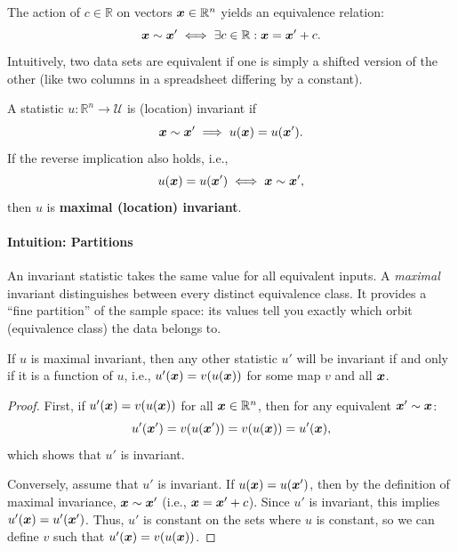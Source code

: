The action of \(c \in \mathbb{R}\) on vectors \(\boldsymbol{x} \in \mathbb{R}^n\) yields an equivalence relation:
\[\boldsymbol{x} \sim \boldsymbol{x}' \iff \exists c \in \mathbb{R} : \boldsymbol{x} = \boldsymbol{x}' + c.\]
Intuitively, two data sets are equivalent if one is simply a shifted version of the other (like two columns in a spreadsheet differing by a constant).

\begin{definition}

A statistic \(u: \mathbb{R}^n \to \mathcal{U}\) is (location) invariant if
\begin{equation*} \label{eq:invariant_def}
\boldsymbol{x} \sim \boldsymbol{x}' \implies u(\boldsymbol{x}) = u(\boldsymbol{x}').
\end{equation*}
If the reverse implication also holds, i.e.,
\begin{equation*} \label{eq:maximal_def}
u(\boldsymbol{x}) = u(\boldsymbol{x}') \iff \boldsymbol{x} \sim \boldsymbol{x}',
\end{equation*}
then \(u\) is \textbf{maximal (location) invariant}.
\end{definition}

\paragraph{Intuition: Partitions}
An invariant statistic takes the same value for all equivalent inputs. A \textit{maximal} invariant distinguishes between every distinct equivalence class. It provides a ``fine partition'' of the sample space: its values tell you exactly which orbit (equivalence class) the data belongs to.

\begin{pro} \label{prop:maximal_rep}
If \(u\) is maximal invariant, then any other statistic \(u'\) will be invariant if and only if it is a function of \(u\), i.e., \(u'(\boldsymbol{x}) = v(u(\boldsymbol{x}))\) for some map \(v\) and all \(\boldsymbol{x}\).
\end{pro}

\begin{proof}
First, if \(u'(\boldsymbol{x}) = v(u(\boldsymbol{x}))\) for all \(\boldsymbol{x} \in \mathbb{R}^n\), then for any equivalent \(\boldsymbol{x}' \sim \boldsymbol{x}\):
\[u'(\boldsymbol{x}') = v(u(\boldsymbol{x}')) = v(u(\boldsymbol{x})) = u'(\boldsymbol{x}),\]
which shows that \(u'\) is invariant. 

Conversely, assume that \(u'\) is invariant. If \(u(\boldsymbol{x}) = u(\boldsymbol{x}')\), then by the definition of maximal invariance, \(\boldsymbol{x} \sim \boldsymbol{x}'\) (i.e., \(\boldsymbol{x} = \boldsymbol{x}' + c\)). Since \(u'\) is invariant, this implies \(u'(\boldsymbol{x}) = u'(\boldsymbol{x}')\). Thus, \(u'\) is constant on the sets where \(u\) is constant, so we can define \(v\) such that \(u'(\boldsymbol{x}) = v(u(\boldsymbol{x}))\).
\end{proof}

